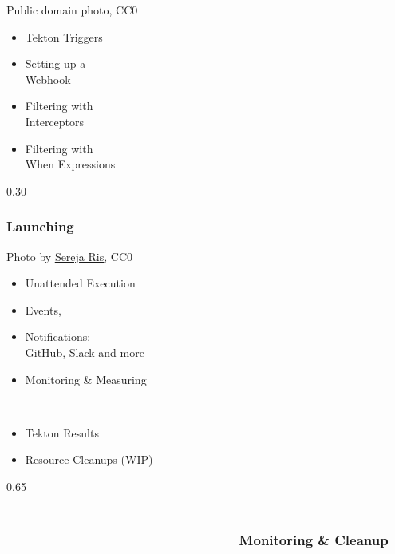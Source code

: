 \documentclass[aspectratio=169,11pt,hyperref={colorlinks=true}]{beamer}
\begin{document}
\begin{lgrayframerpic}{Public domain photo, CC0}%
  {%
  \begin{itemize}
    \item Tekton Triggers
    \item Setting up a\\Webhook
    \item Filtering with\\Interceptors
    \item Filtering with\\When Expressions
  \end{itemize}
  }%
  {0.30}
  \frametitle{Launching}
\end{lgrayframerpic}

\begin{lpicrblack}{%
  Photo by \href{https://unsplash.com/@serejaris}{\underline{Sereja Ris}}, CC0
  }%
  {%
  \begin{itemize}
    \item Unattended Execution
    \item Events, 
    \item Notifications:\\GitHub, Slack and more
    \item Monitoring \& Measuring
  \end{itemize}
  ~\\
  \begin{itemize}
    \item Tekton Results
    \item Resource Cleanups (WIP)
  \end{itemize}
  }%
  {0.65}%
  \frametitle{~~~~~~~~~~~~~~~~~~~~~~~~~~~~~~~~~~~~~~~~~~~~~~~~~~~~~~~~~~~~~~~~~~~~~~~~~~~~~~~~~~~~Monitoring \& Cleanup}
\end{lpicrblack}
\end{document}
